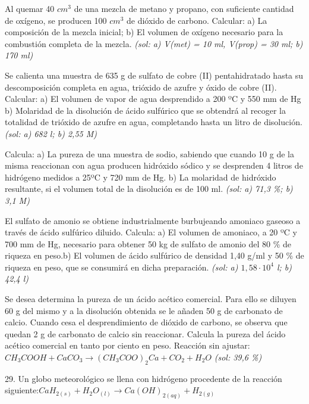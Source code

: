\begin{multicols}{2}
\begin{problem}
Al quemar 40 $cm^3$ de una mezcla de metano y propano, con suficiente cantidad de oxígeno, se producen 100 $cm^3$ de dióxido de carbono. Calcular: a) La composición de la mezcla inicial; b) El volumen de oxígeno necesario para la combustión completa de la mezcla. \textit{\scriptsize(sol: a) V(met) = 10 ml, V(prop) = 30 ml; b) 170 ml)}	
\end{problem}
\begin{problem}
Se calienta una muestra de 635 g de sulfato de cobre (II) pentahidratado hasta su descomposición completa en agua, trióxido de azufre y óxido de cobre (II). Calcular: a) El volumen de vapor de agua desprendido a 200 ºC y 550 mm de Hg b)	Molaridad de la disolución de ácido sulfúrico que se obtendrá al recoger la totalidad de trióxido de azufre en agua, completando hasta un litro de disolución.\textit{\scriptsize(sol: a) 682 l; b) 2,55 M)}
\end{problem}
\begin{problem}
Calcula: a) La pureza de una muestra de sodio, sabiendo que cuando 10 g de la misma reaccionan con agua producen hidróxido sódico y se desprenden 4 litros de hidrógeno medidos a 25ºC y 720 mm de Hg. b) La molaridad de hidróxido resultante, si el volumen total de la disolución es de 100 ml. \textit{\scriptsize(sol: a) 71,3 \%; b) 3,1 M)}
\end{problem}
\begin{problem}
El sulfato de amonio se obtiene industrialmente burbujeando amoniaco gaseoso a través de ácido sulfúrico diluido. Calcula: a)	El volumen de amoniaco, a 20 ºC y 700 mm de Hg, necesario para obtener 50 kg de sulfato de amonio del 80 \% de riqueza en peso.b) El volumen de ácido sulfúrico de densidad 1,40 g/ml y 50 \% de riqueza en peso, que se consumirá en dicha preparación. \textit{\scriptsize(sol: a) $1,58\cdot 10^4$ l; b) 42,4 l)}
\end{problem}
\begin{problem}
Se desea determina la pureza de un ácido acético comercial. Para ello se diluyen 60 g del mismo y a la disolución obtenida se le añaden 50 g de carbonato de calcio. Cuando cesa el desprendimiento de dióxido de carbono, se observa que quedan 2 g de carbonato de calcio sin reaccionar. Calcula la pureza del ácido acético comercial en tanto por ciento en peso. Reacción sin ajustar: $CH_3COOH + CaCO_3 \longrightarrow (CH_3COO)_2Ca + CO_2 + H_2O$	 \textit{\scriptsize(sol: 39,6 \%)}
\end{problem}
\begin{problem}
	29.	Un globo meteorológico se llena con hidrógeno procedente de la reacción siguiente:$CaH_{2(s)} + H_2O_{(l)} \longrightarrow Ca(OH)_{2(aq)} + H_{2(g)}$

\end{problem}
\end{multicols}
